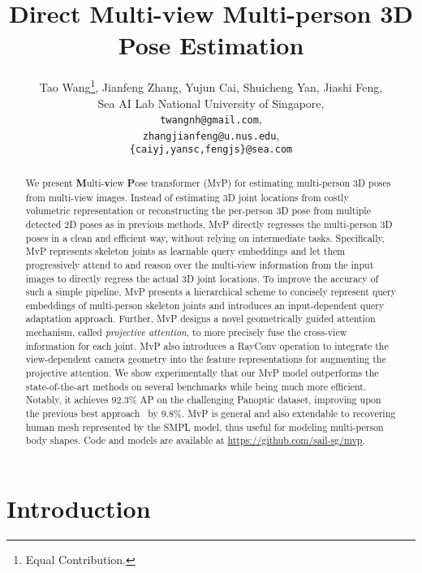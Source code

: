 \documentclass{article}
\title{
Direct Multi-view Multi-person 3D  Pose Estimation
}
\author{Tao Wang\thanks{Equal Contribution.},
  Jianfeng Zhang,
  Yujun Cai,
  Shuicheng Yan,
  Jiashi Feng,
  \\
  Sea AI Lab
  National University of Singapore, \\
  \texttt{twangnh@gmail.com}, \\
  \texttt{zhangjianfeng@u.nus.edu},\\
  \texttt{\{caiyj,yansc,fengjs\}@sea.com}
}
\newcommand{\nameofmodel}[1]{MvP}
\begin{document}
\maketitle

\begin{abstract}


We present \textbf{M}ulti-\textbf{v}iew \textbf{P}ose transformer (MvP) for estimating multi-person 3D poses from multi-view images. Instead of estimating 3D joint locations from costly volumetric representation or reconstructing the per-person 3D pose from multiple detected 2D poses as in previous methods, MvP directly regresses the multi-person 3D poses in a clean and efficient way, without relying on intermediate tasks.
Specifically,  MvP 
represents skeleton joints as learnable query
embeddings and let them progressively attend to and reason over the multi-view information from the input images to directly regress the actual 3D joint locations. 
To improve the accuracy of such a simple pipeline, MvP presents a hierarchical scheme to concisely represent query embeddings of multi-person skeleton joints and introduces an input-dependent query adaptation approach. 
Further, MvP designs a novel geometrically guided attention mechanism, called \textit{projective attention},  to more precisely fuse the cross-view information for each joint. MvP also introduces a RayConv operation to integrate the view-dependent camera geometry into the feature representations for augmenting the projective attention. 
We show experimentally that our MvP model outperforms the state-of-the-art methods on several benchmarks while being much more efficient.
Notably, it achieves 92.3\% AP on the challenging Panoptic dataset, improving upon the previous best approach~\cite{Tu2020} by 9.8\%.
\nameofmodel{} is general and also extendable to recovering human mesh represented by the SMPL model, thus useful for modeling multi-person body shapes. Code and models are available at \url{https://github.com/sail-sg/mvp}.



\end{abstract}



\section{Introduction}
\end{document}
